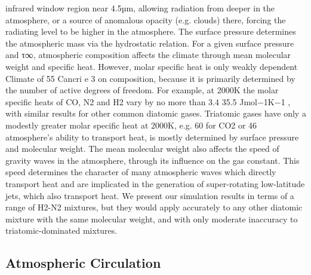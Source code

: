 infrared window region near 4.5µm, allowing radiation
from deeper in the atmosphere, or a source of anomalous
opacity (e.g. clouds) there, forcing the radiating level to
be higher in the atmosphere.
The surface pressure determines the atmospheric mass
via the hydrostatic relation. For a given surface pressure and τ∞, atmospheric composition affects the climate through mean molecular weight and specific heat.
However, molar specific heat is only weakly dependent
Climate of 55 Cancri e 3
on composition, because it is primarily determined by
the number of active degrees of freedom. For example, at 2000K the molar specific heats of CO, N2 and H2
vary by no more than 3.4%
35.5 Jmol−1K−1
, with similar results for other common
diatomic gases. Triatomic gases have only a modestly
greater molar specific heat at 2000K, e.g. 60%
for CO2 or 46%
atmosphere’s ability to transport heat, is mostly determined by surface pressure and molecular weight. The
mean molecular weight also affects the speed of gravity
waves in the atmosphere, through its influence on the
gas constant. This speed determines the character of
many atmospheric waves which directly transport heat
and are implicated in the generation of super-rotating
low-latitude jets, which also transport heat. We present
our simulation results in terms of a range of H2-N2 mixtures, but they would apply accurately to any other diatomic mixture with the same molecular weight, and
with only moderate inaccuracy to triatomic-dominated
mixtures.


\subsection*{Atmospheric Circulation}

